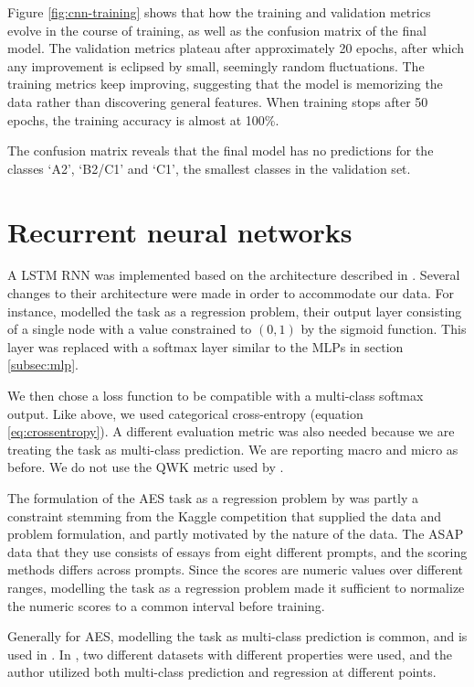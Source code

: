 Figure \ref{fig:cnn-training} shows that how the training and validation
metrics evolve in the course of training, as well as the confusion matrix of
the final model. The validation metrics plateau after approximately 20
epochs, after which any improvement is eclipsed by small, seemingly random
fluctuations. The training metrics keep improving, suggesting that the model
is memorizing the data rather than discovering general features. When
training stops after 50 epochs, the training accuracy is almost at 100\%.

The confusion matrix reveals that the final model has no predictions for the
classes `A2', `B2/C1' and `C1', the smallest classes in the validation set.


\section{Recurrent neural networks}

A \ac{LSTM} \ac{RNN} was implemented based on the architecture described in
\textcite{taghipour16}. Several changes to their architecture were made in
order to accommodate our data. For instance, \citeauthor{taghipour16}
modelled the task as a regression problem, their output layer consisting of a
single node with a value constrained to $(0,1)$ by the sigmoid function. This
layer was replaced with a softmax layer similar to the \acp{MLP} in section
\ref{subsec:mlp}.

We then chose a loss function to be compatible with a multi-class softmax
output. Like above, we used categorical cross-entropy (equation
\ref{eq:crossentropy}). A different evaluation metric was also needed because
we are treating the task as multi-class prediction. We are reporting macro
and micro \FI as before. We do not use the \ac{QWK} metric used by
\citeauthor{taghipour16}.

The formulation of the \ac{AES} task as a regression problem by
\citeauthor{taghipour16} was partly a constraint stemming from the Kaggle
competition that supplied the data and problem formulation, and partly
motivated by the nature of the data. The ASAP data that they use consists of
essays from eight different prompts, and the scoring methods differs across
prompts. Since the scores are numeric values over different ranges, modelling
the task as a regression problem made it sufficient to normalize the numeric
scores to a common interval before training.

Generally for \ac{AES}, modelling the task as multi-class prediction is
common, and is used in \textcite{vajjala18universalCEFR}. In
\textcite{vajjala17}, two different datasets with different properties were
used, and the author utilized both multi-class prediction and regression at
different points.

